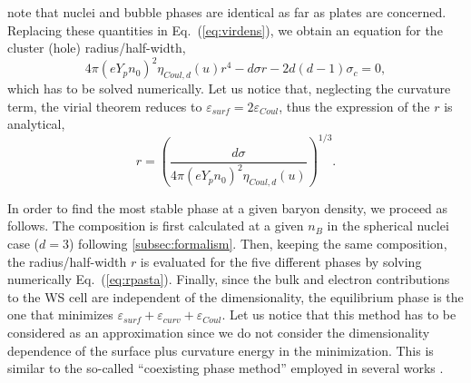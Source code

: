 note that nuclei and bubble phases are identical as far as plates are concerned. 
Replacing these quantities in Eq.~(\ref{eq:virdens}), we obtain an equation for
the cluster (hole) radius/half-width,
%
\begin{equation}
  4\pi(eY_pn_0)^2\eta_{Coul,d}(u){r}^4 - d\sigma r - 2d(d-1)\sigma_c 
  = 0,\label{eq:rpasta}
\end{equation}
%
which has to be solved numerically. Let us notice that, neglecting the 
curvature term, the virial theorem reduces 
to $\varepsilon_{surf} = 2\varepsilon_{Coul}$, thus the expression of the 
$r$ is analytical,
%
\begin{equation}
  r =
  \left(\frac{d\sigma}{4\pi(eY_pn_0)^2\eta_{Coul,d}(u)}\right)^{1/3}.
\end{equation}

In order to find the most stable phase at a given baryon density, we proceed as
follows. 
The composition is first calculated at a given $n_B$ in the spherical nuclei 
case ($d=3$) following \ref{subsec:formalism}. Then, keeping the same 
composition, the radius/half-width $r$ is evaluated for the five different 
phases by solving numerically Eq.~(\ref{eq:rpasta}). Finally, since the bulk
and electron contributions to the WS cell are independent of the 
dimensionality, the equilibrium phase is the one that minimizes 
$\varepsilon_{surf} + \varepsilon_{curv} 
+ \varepsilon_{Coul}$. {Let us notice that this method has to be
  considered as an approximation since we do not consider the dimensionality 
  dependence of the surface plus curvature energy in the minimization. This is 
  similar to the so-called ``coexisting phase method'' employed in several 
works \cite{Avancini2008,Avancini2010,Grams2017}.}

